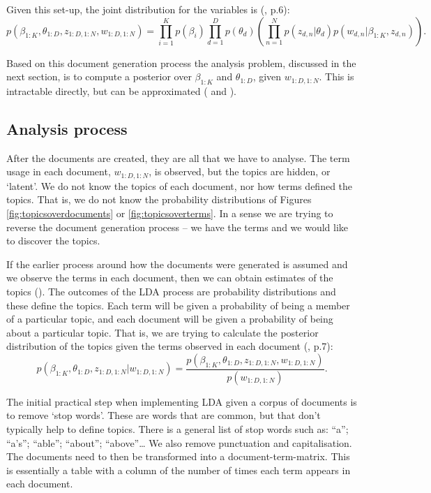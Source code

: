 \documentclass[
]{book}
\begin{document}
Given this set-up, the joint distribution for the variables is (\citet{blei2012}, p.6):
\[p(\beta_{1:K}, \theta_{1:D}, z_{1:D, 1:N}, w_{1:D, 1:N}) = \prod^{K}_{i=1}p(\beta_i) \prod^{D}_{d=1}p(\theta_d) \left(\prod^N_{n=1}p(z_{d,n}|\theta_d)p\left(w_{d,n}|\beta_{1:K},z_{d,n}\right) \right).\]

Based on this document generation process the analysis problem, discussed in the next section, is to compute a posterior over \(\beta_{1:K}\) and \(\theta_{1:D}\), given \(w_{1:D, 1:N}\). This is intractable directly, but can be approximated (\citet{GriffithsSteyvers2004} and \citet{blei2012}).

\hypertarget{analysis-process}{%
\subsection{Analysis process}\label{analysis-process}}

After the documents are created, they are all that we have to analyse. The term usage in each document, \(w_{1:D, 1:N}\), is observed, but the topics are hidden, or `latent'. We do not know the topics of each document, nor how terms defined the topics. That is, we do not know the probability distributions of Figures \ref{fig:topicsoverdocuments} or \ref{fig:topicsoverterms}. In a sense we are trying to reverse the document generation process -- we have the terms and we would like to discover the topics.

If the earlier process around how the documents were generated is assumed and we observe the terms in each document, then we can obtain estimates of the topics (\citet{SteyversGriffiths2006}). The outcomes of the LDA process are probability distributions and these define the topics. Each term will be given a probability of being a member of a particular topic, and each document will be given a probability of being about a particular topic. That is, we are trying to calculate the posterior distribution of the topics given the terms observed in each document (\citet{blei2012}, p.7):
\[p(\beta_{1:K}, \theta_{1:D}, z_{1:D, 1:N} | w_{1:D, 1:N}) = \frac{p\left(\beta_{1:K}, \theta_{1:D}, z_{1:D, 1:N}, w_{1:D, 1:N}\right)}{p(w_{1:D, 1:N})}.\]

The initial practical step when implementing LDA given a corpus of documents is to remove `stop words'. These are words that are common, but that don't typically help to define topics. There is a general list of stop words such as: ``a''; ``a's''; ``able''; ``about''; ``above''\ldots{} We also remove punctuation and capitalisation. The documents need to then be transformed into a document-term-matrix. This is essentially a table with a column of the number of times each term appears in each document.
\end{document}
